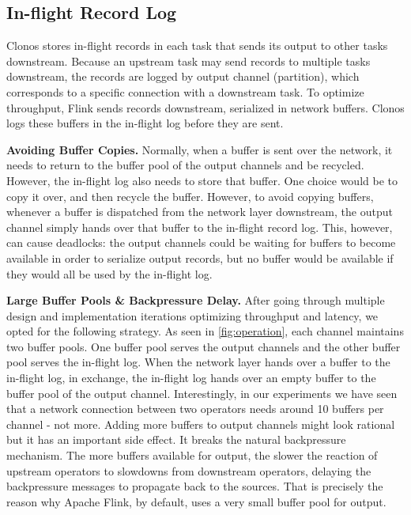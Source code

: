 \documentclass[sigconf]{acmart}
\newcommand{\para}[1]{\vspace{1mm}\noindent\textbf{#1.}}
\begin{document}

\subsection{In-flight Record Log}
\label{sec:in-flight-design}

Clonos stores in-flight records in each task that sends its output to other tasks downstream.
Because an upstream task may send records to multiple tasks downstream, the records are logged by output channel (partition), which corresponds to a specific connection with a downstream task. 
To optimize throughput, Flink sends records downstream, serialized in network buffers. Clonos logs these buffers in the in-flight log before they are sent.

\para{Avoiding Buffer Copies} Normally, when a buffer is sent over the network, it needs to return to the buffer pool of the output channels and be recycled. However, the in-flight log also needs to store that buffer. One choice would be to copy it over, and then recycle the buffer. However, to avoid copying buffers, whenever a buffer is dispatched from the network layer downstream, the output channel simply hands over that buffer to the in-flight record log.
This, however, can cause deadlocks: the output channels could be waiting for buffers to become available in order to serialize output records, but no buffer would be available if they would all be used by the in-flight log.

\para{Large Buffer Pools \& Backpressure Delay} After going through multiple design and implementation iterations optimizing throughput and latency, we opted for the following strategy. As seen in \autoref{fig:operation}, each channel maintains two buffer pools. One buffer pool serves the output channels and the other buffer pool serves the in-flight log. When the network layer hands over a buffer to the in-flight log, in exchange, the in-flight log hands over an empty buffer to the buffer pool of the output channel. Interestingly, in our experiments we have seen that a network  connection between two operators needs around 10 buffers per channel - not more. Adding more buffers to output channels might look rational but it has an important side effect. It breaks the natural backpressure mechanism. The more buffers available for output, the slower the reaction of upstream operators to slowdowns from downstream operators, delaying the backpressure messages to propagate back to the sources. That is precisely the reason why Apache Flink, by default, uses a very small buffer pool for output. 
\end{document}
